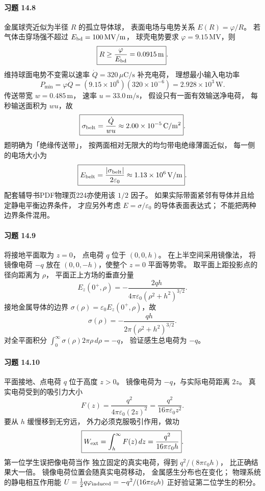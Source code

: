 \paragraph{习题 14.8}
金属球壳近似为半径 \(R\) 的孤立导体球，
表面电场与电势关系
\(E(R)=\varphi/R\)。
若气体击穿场强不超过
\(E_{\rm bd}=100\,\mathrm{MV/m}\)，
球壳电势要求 \(\varphi=9.15\,\mathrm{MV}\)，则
\[
 \boxed{R\ge\frac{\varphi}{E_{\rm bd}}
 =0.0915\,\mathrm m}.
\]
维持球面电势不变需以速率
\(\dot Q=320\,\mu\mathrm{C/s}\) 补充电荷，
理想最小输入电功率
\[
 \boxed{P_{\min}=\varphi\dot Q
 =(9.15\times10^6)(320\times10^{-6})
 =2.928\times10^3\,\mathrm W}.
\]
传送带宽 \(w=0.485\,\mathrm m\)，
速率 \(u=33.0\,\mathrm{m/s}\)，
假设只有一面有效输送净电荷，
每秒输送面积为 \(wu\)，故
\[
 \boxed{\sigma_{\rm belt}=\frac{\dot Q}{wu}
 \approx2.00\times10^{-5}\,\mathrm{C/m^2}}.
\]
题明确为「绝缘传送带」，
按两面相对无限大的均匀带电绝缘薄面近似，
每一侧的电场大小为
\[
 \boxed{E_{\rm belt}=\frac{|\sigma_{\rm belt}|}{2\varepsilon_0}
 \approx1.13\times10^6\,\mathrm{V/m}}.
\]
配套辅导书PDF物理页224亦使用该 \(1/2\) 因子。
如果实际带面紧邻有导体并且给定静电平衡边界条件，
才应另外考虑 \(E=\sigma/\varepsilon_0\)
的导体表面表达式；
不能把两种边界条件混用。

\paragraph{习题 14.9}
将接地平面取为 \(z=0\)，
点电荷 \(q\) 位于 \((0,0,h)\)。
在上半空间采用镜像法，
将镜像电荷 \(-q\) 放在
\((0,0,-h)\)，使整个 \(z=0\) 平面等势零。
取平面上距投影点的径向距离为 \(\rho\)，
平面正上方场的垂直分量
\[
 E_z(0^+,\rho)=
 -\frac{2qh}{4\pi\varepsilon_0(\rho^2+h^2)^{3/2}}.
\]
接地金属导体的边界
\(\sigma(\rho)=\varepsilon_0E_z(0^+,\rho)\)，故
\[
 \boxed{\sigma(\rho)=
 -\frac{qh}{2\pi(\rho^2+h^2)^{3/2}}}.
\]
对全平面积分
\(\int_0^\infty\sigma(\rho)2\pi\rho\,d\rho=-q\)，
验证感生总电荷为 \(-q\)。

\paragraph{习题 14.10}
平面接地、点电荷 \(q\) 位于高度 \(z>0\)。
镜像电荷为 \(-q\)，与实际电荷距离 \(2z\)。
真实电荷受到的吸引力大小
\[
 F(z)=\frac{q^2}{4\pi\varepsilon_0(2z)^2}
 =\frac{q^2}{16\pi\varepsilon_0z^2}.
\]
要从 \(h\) 缓慢移到无穷远，
外力必须克服吸引作用，做功
\[
 \boxed{W_{\rm ext}=\int_h^\infty F(z)\,dz
 =\frac{q^2}{16\pi\varepsilon_0h}}.
\]
第一位学生误把像电荷当作
独立固定的真实电荷，得到
\(q^2/(8\pi\varepsilon_0h)\)，
比正确结果大一倍。
镜像电荷位置会随真实电荷移动，
金属感生分布也在变化；
物理系统的静电相互作用能
\(U=\tfrac12 q\varphi_{\rm induced}
 =-q^2/(16\pi\varepsilon_0h)\)
正好验证第二位学生的积分。

